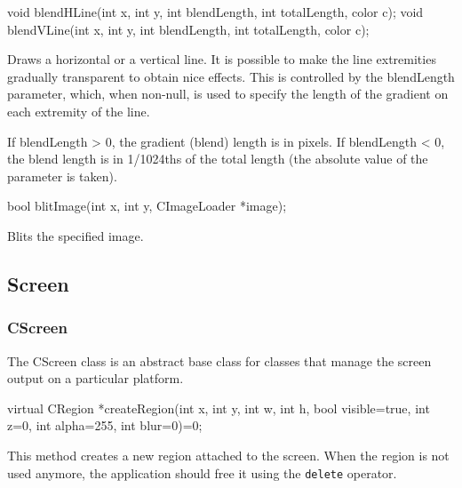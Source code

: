 \documentclass[a4paper,11pt]{journal}
\begin{document}
\begin{verbatimtab}
void blendHLine(int x, int y, int blendLength, int totalLength, color c);
void blendVLine(int x, int y, int blendLength, int totalLength, color c);
\end{verbatimtab}
Draws a horizontal or a vertical line. It is possible to make the line extremities gradually transparent to obtain nice effects. This is controlled by the blendLength parameter, which, when non-null, is used to specify the length of the gradient on each extremity of the line.

If blendLength > 0, the gradient (blend) length is in pixels. If blendLength < 0, the blend length is in 1/1024ths of the total length (the absolute value of the parameter is taken).\\
\begin{verbatimtab}bool blitImage(int x, int y, CImageLoader *image);\end{verbatimtab}
Blits the specified image.

\subsection{Screen}
\subsubsection{CScreen}
The CScreen class is an abstract base class for classes that manage the screen output on a particular platform.\\
\begin{verbatimtab}virtual CRegion *createRegion(int x, int y, int w, int h, bool visible=true,
int z=0, int alpha=255, int blur=0)=0;\end{verbatimtab}
This method creates a new region attached to the screen. When the region is not used anymore, the application should free it using the \verb!delete! operator.
\end{document}
